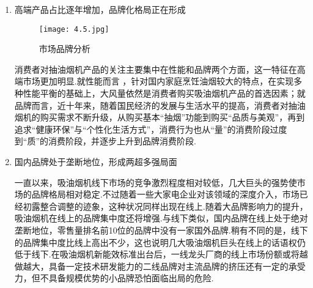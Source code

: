 \begin{enumerate}
\item 高端产品占比逐年增加，品牌化格局正在形成

      \begin{figure}[H]
      \centering
      \texttt{[image: 4.5.jpg]}
      \caption{市场品牌分析}
      \label{市场品牌分析}
      \end{figure}

      消费者对抽油烟机产品的关注主要集中在性能和品牌两个方面，这一特征在高端市场更加明显.就性能而言 ，针对国内家庭烹饪油烟较大的特点，在实现多种性能平衡的基础上，大风量依然是消费者购买吸油烟机产品的首选因素；就品牌而言，近十年来，随着国民经济的发展与生活水平的提高，消费者对抽油烟机的购买需求不断升级，从购买基本“抽烟”功能到购买“品质与美观”，再到追求“健康环保”与“个性化生活方式”，消费行为也从“量”的消费阶段过度到“质”的消费阶段，并逐步上升到品牌消费阶段.

\item 国内品牌处于垄断地位，形成两超多强局面

      一直以来，吸油烟机线下市场的竞争激烈程度相对较低，几大巨头的强势使市场的品牌格局相对稳定.不过随着一些大家电企业对该领域的深度介入，市场已经初露整合调整的迹象，这种状况同样出现在线上.随着大品牌影响力的提升，吸油烟机在线上的品牌集中度还将增强.与线下类似，国内品牌在线上处于绝对垄断地位，零售量排名前10位的品牌中没有一家国外品牌.稍有不同的是，线下的品牌集中度比线上高出不少，这也说明几大吸油烟机巨头在线上的话语权仍低于线下.在吸油烟机新能效标准出台后，一线龙头厂商的线上市场份额或将越做越大，具备一定技术研发能力的二线品牌对主流品牌的挤压还有一定的承受力，但不具备规模优势的小品牌恐怕面临出局的危险.
\end{enumerate}

